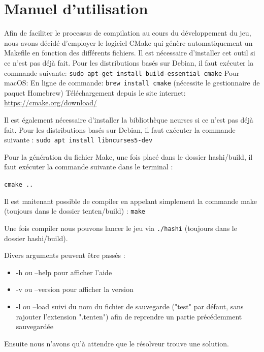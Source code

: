 \documentclass{article}
\begin{document}
\section{\LARGE Manuel d'utilisation}

\hspace{0.5cm} Afin de faciliter le processus de compilation au cours du développement du jeu, nous avons décidé d'employer le logiciel CMake qui génère automatiquement un Makefile en fonction des différents fichiers. Il est nécessaire d'installer cet outil si ce n'est pas déjà fait. \newline
Pour les distributions basés sur Debian, il faut exécuter la commande suivante: \newline
\noindent \texttt{sudo apt-get install build-essential cmake}
\newline
Pour macOS: \newline
En ligne de commande: \newline
\texttt{brew install cmake} (nécessite le gestionnaire de paquet Homebrew) \newline
Téléchargement depuis le site internet: \newline
\url{https://cmake.org/download/} \newline


Il est également nécessaire d'installer la bibliothèque ncurses si ce n'est pas déjà fait.
Pour les distributions basés sur Debian, il faut exécuter la commande suivante : \newline
\noindent \texttt{sudo apt install libncurses5-dev}

Pour la génération du fichier Make, une fois placé dans le dossier hashi/build, il faut exécuter la commande suivante dans le terminal :

\noindent \texttt{cmake ..}

Il est maitenant possible de compiler en appelant simplement la commande make (toujours dans le dossier tenten/build) :\newline
\texttt{make}


Une fois compiler nous pouvons lancer le jeu via \texttt{./hashi} (toujours dans le dossier hashi/build).

Divers arguments peuvent être passés :
\begin{itemize}
\item -h ou --help pour afficher l'aide
\item -v ou --version pour afficher la version
\item -l ou --load suivi du nom du fichier de sauvegarde ("test" par défaut, sans rajouter l'extension ".tenten") afin de reprendre un partie précédemment sauvegardée 
\end{itemize}
Ensuite nous n'avons qu'à attendre que le résolveur trouve une solution.
\end{document}
